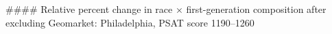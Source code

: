 #### Relative percent change in race × first-generation composition after excluding Geomarket: Philadelphia, PSAT score 1190–1260
